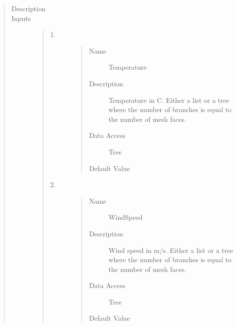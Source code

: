 \documentclass[letterpaper,10pt,english]{sphinxmanual}
\begin{document}
\begin{quote}\begin{description}
\item[{Description}] \leavevmode
{}

\item[{Inputs}] \leavevmode\begin{quote}\begin{description}
\item[{1.}] \leavevmode\begin{quote}\begin{description}
\item[{Name}] \leavevmode
Temperature

\item[{Description}] \leavevmode
Temperature in C. Either a list or a tree where the number of branches is equal to the number
of mesh faces.

\item[{Data Access}] \leavevmode
Tree

\item[{Default Value}] \leavevmode
{}

\end{description}\end{quote}

\item[{2.}] \leavevmode\begin{quote}\begin{description}
\item[{Name}] \leavevmode
WindSpeed

\item[{Description}] \leavevmode
Wind speed in m/s. Either a list or a tree where the number of branches is equal to the number
of mesh faces.

\item[{Data Access}] \leavevmode
Tree

\item[{Default Value}] \leavevmode
{}


\end{description}
\end{quote}
\end{description}
\end{quote}
\end{description}
\end{quote}
\end{document}
